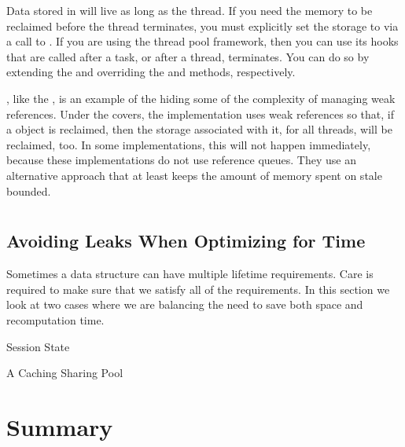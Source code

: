 Data stored in \tls will live as long as the thread. If you need
the memory to be reclaimed before the thread terminates, you must explicitly set
the storage to  via a call to . If you are using
the  thread pool framework, then you can use its
hooks that are called after a task, or after a thread, terminates. You can do so
by extending the  and overriding the
 and  methods, respectively.

\Tls, like the , is an example of the \jre hiding some of the
complexity of managing weak references. Under the covers, the \tls implementation
uses weak references so that, if a  object is reclaimed, then
the storage associated with it, for all threads, will be reclaimed, too. In some
implementations, this will not happen immediately, because these implementations
do not use reference queues. They use an alternative approach that at least
keeps the amount of memory spent on stale \tls bounded.

\section{}

\subsection{Avoiding Leaks When Optimizing for Time}
Sometimes a data structure can have multiple lifetime requirements. 
Care is required to make sure that we satisfy all of the requirements.  In this
section we look at two cases where we are balancing the need to save both space and recomputation
time.

\begin{example}{Session State}
\end{example}

\begin{example}{A Caching Sharing Pool}
\end{example}


\section{Summary}






